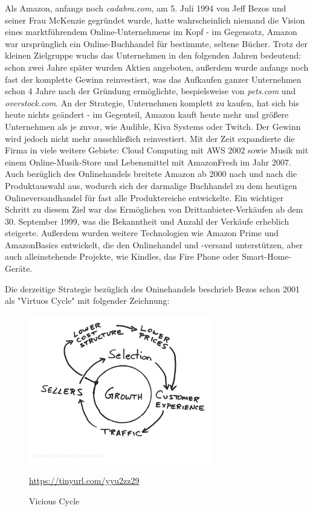 Als Amazon, anfangs noch \emph{cadabra.com}, am 5. Juli 1994 von Jeff Bezos und seiner Frau McKenzie gegründet wurde, hatte wahrscheinlich niemand die Vision eines marktführendem Online-Unternehmens im Kopf - im Gegensatz, Amazon war ursprünglich ein Online-Buchhandel für bestimmte, seltene Bücher\cite[S. 17]{Graf}. Trotz der kleinen Zielgruppe wuchs das Unternehmen in den folgenden Jahren bedeutend: schon zwei Jahre später wurden Aktien angeboten, außerdem wurde anfangs noch fast der komplette Gewinn reinvestiert\cite{Rosoff}, was das Aufkaufen ganzer Unternehmen schon 4 Jahre nach der Gründung ermöglichte, bespielsweise von \emph{pets.com} und \emph{overstock.com}\cite{ChannelAdvisor}. An der Strategie, Unternehmen komplett zu kaufen, hat sich bis heute nichts geändert - im Gegenteil, Amazon kauft heute mehr und größere Unternehmen als je zuvor\cite[S. 27]{Haendlerbund}, wie Audible, Kiva Systems oder Twitch\cite{Sherman}. Der Gewinn wird jedoch nicht mehr ausschließich reinvestiert\cite{Rosoff}. Mit der Zeit expandierte die Firma in viele weitere Gebiete: Cloud Computing mit \ac{AWS} 2002 sowie Musik mit einem Online-Musik-Store und Lebensmittel mit AmazonFresh im Jahr 2007\cite{Sherman, ChannelAdvisor}. Auch bezüglich des Onlinehandels breitete Amazon ab 2000 nach und nach die Produktauswahl aus, wodurch sich der darmalige Buchhandel zu dem heutigen Onlineversandhandel für fast alle Produktereiche entwickelte. Ein wichtiger Schritt zu diesem Ziel war das Ermöglichen von Drittanbieter-Verkäufen ab dem 30. September 1999, was die Bekanntheit und Anzahl der Verkäufe erheblich steigerte\cite{Sherman}. Außerdem wurden weitere Technologien wie Amazon Prime und AmazonBasics entwickelt, die den Onlinehandel und -versand unterstützen\cite{ChannelAdvisor}, aber auch alleinstehende Projekte, wie Kindles, das Fire Phone oder Smart-Home-Geräte\cite{Sherman}.

Die derzeitige Strategie bezüglich des Oninehandels beschrieb Bezos schon 2001 als "Virtuos Cycle" mit folgender Zeichnung\cite{zentail}:%

\begin{figure}[h]
    \begin{center}
        \includegraphics[width=8cm]{media/Fabian-vicious-cycle.png}
        \caption{Vicious Cycle}
        \label{vicious-cycle}
        \bildquelle\url{https://tinyurl.com/yyu2zz29}
    \end{center}
\end{figure}

